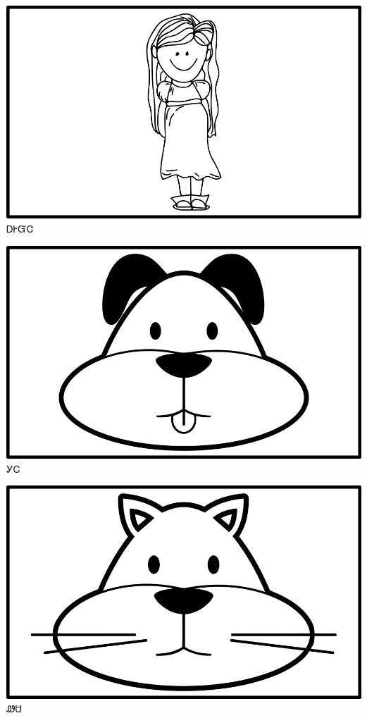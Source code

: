 \documentclass[avery5371]{flashcards}%
\begin{document}
    \begin{flashcard}{
        \includegraphics[width=0.95\columnwidth,height=.51\columnwidth,keepaspectratio]{../artwork/objects-animate/agehyuja}
    }
        \Huge ᎠᎨᏳᏣ
    \end{flashcard}


    \begin{flashcard}{
        \includegraphics[width=0.95\columnwidth,height=.51\columnwidth,keepaspectratio]{../artwork/objects-animate/gihli}
    }
        \Huge ᎩᏟ
    \end{flashcard}

    \begin{flashcard}{
        \includegraphics[width=0.95\columnwidth,height=.51\columnwidth,keepaspectratio]{../artwork/objects-animate/wesa}
    }
        \Huge ᏪᏌ
    \end{flashcard}
\end{document}
